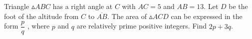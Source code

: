 Triangle $\vartriangle ABC$ has a right angle at $C$ with $AC = 5$ and $AB = 13$. Let $D$ be the foot of the altitude from $C$ to $\overline{AB}$. The area of $\vartriangle ACD$ can be expressed in the form $\dfrac{p}{q}$ , where $p$ and $q$ are relatively prime positive integers. Find $2p + 3q$.
